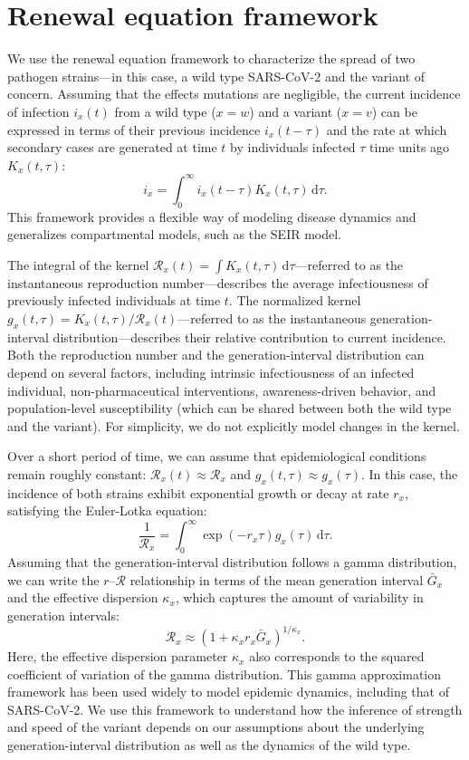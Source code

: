 \documentclass[12pt]{article}
\newcommand{\RR}{\ensuremath{{\mathcal R}}\xspace}
\newcommand{\dd}[1]{\ensuremath{\, \mathrm{d}#1}}
\newcommand{\dtau}{\dd{\tau}}
\begin{document}
\section{Renewal equation framework}

We use the renewal equation framework to characterize the spread of two pathogen strains---in this case, a wild type SARS-CoV-2 and the variant of concern.
Assuming that the effects mutations are negligible, the current incidence of infection $i_x(t)$ from a wild type ($x=w$) and a variant ($x=v$) can be expressed in terms of their previous incidence $i_x(t-\tau)$ and the rate at which secondary cases are generated at time $t$ by individuals infected $\tau$ time units ago $K_x(t, \tau)$:
\begin{equation}
i_x = \int_0^\infty i_x(t-\tau) K_x(t, \tau) \dtau.
\end{equation}
This framework provides a flexible way of modeling disease dynamics and generalizes compartmental models, such as the SEIR model.

The integral of the kernel $\RR_x(t) = \int K_x(t, \tau) \dtau$---referred to as the instantaneous reproduction number---describes the average infectiousness of previously infected individuals at time $t$.
The normalized kernel $g_x(t, \tau) = K_x(t, \tau)/\RR_x(t)$---referred to as the instantaneous generation-interval distribution---describes their relative contribution to current incidence.
Both the reproduction number and the generation-interval distribution can depend on several factors, including intrinsic infectiousness of an infected individual, non-pharmaceutical interventions, awareness-driven behavior, and population-level susceptibility (which can be shared between both the wild type and the variant).
For simplicity, we do not explicitly model changes in the kernel.

Over a short period of time, we can assume that epidemiological conditions remain roughly constant: $\RR_x(t) \approx \RR_x$ and $g_x(t, \tau) \approx g_x(\tau)$.
In this case, the incidence of both strains exhibit exponential growth or decay at rate $r_x$, satisfying the Euler-Lotka equation:
\begin{equation}
\frac{1}{\RR_x} = \int_0^\infty \exp(- r_x \tau) g_x(\tau) \dtau.
\end{equation}
Assuming that the generation-interval distribution follows a gamma distribution, we can write the $r$--$\RR$ relationship in terms of the mean generation interval $\bar{G}_x$ and the effective dispersion $\kappa_x$, which captures the amount of variability in generation intervals:
\begin{equation}
\RR_x \approx (1 + \kappa_x r_x \bar{G}_x)^{1/\kappa_x}.
\end{equation}
Here, the effective dispersion parameter $\kappa_x$ also corresponds to the squared coefficient of variation of the gamma distribution.
This gamma approximation framework has been used widely to model epidemic dynamics, including that of SARS-CoV-2.
We use this framework to understand how the inference of strength and speed of the variant depends on our assumptions about the underlying generation-interval distribution as well as the dynamics of the wild type.
\end{document}
